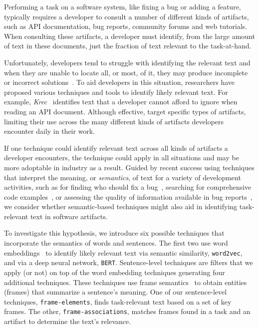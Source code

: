 Performing a task on a software system, like fixing a bug
or adding a feature, typically requires a developer to consult
a number of different kinds of artifacts, such
as API documentation, bug reports, community forums
and web tutorials.  When consulting these artifacts,
a developer must identify, from the large amount of text
in these documents, just the fraction of text relevant
to the task-at-hand.



Unfortunately, developers tend to struggle with identifying
the relevant text and when they are unable to locate all, or most, of it,
they may produce incomplete or incorrect solutions~\cite{Murphy2005}.
To aid developers in this situation,
researchers have proposed various
techniques and tools to
identify likely relevant text.
For example,
\textit{Krec}~\cite{Robillard2015}
identifies text that a developer cannot afford to ignore when reading an API document.
Although effective, 
target specific
types of artifacts, limiting their use across the
many different kinds of artifacts developers encounter
daily in their work.



If one technique could identify relevant text across all kinds
of artifacts a developer encounters, the technique
could apply in all situations and may be more adoptable in industry
as a result. Guided by recent success  using
techniques that interpret the meaning, or \textit{semantics}, of text
for a variety of development activities, such as
for finding who should fix a bug~\cite{yang2016}, searching for comprehensive code examples~\cite{silva2019},
or assessing the quality of information available in bug reports~\cite{chaparro2019}, we consider
 whether
semantic-based techniques might also aid in identifying
task-relevant text in software artifacts.


To investigate this hypothesis, we introduce six possible techniques that incorporate the
semantics of words and sentences.
The first two use word embeddings~\cite{Mikolov2013} to identify likely relevant text via semantic similarity, \texttt{word2vec},
and via a deep neural network, \texttt{BERT}.
Sentence-level techniques are filters that we apply (or not) on top of the word embedding techniques generating four additional techniques.
These techniques use frame semantics~\cite{fillmore1976frame} to obtain entities (frames) that summarize a sentence's meaning.
One of our sentence-level techniques, \texttt{frame-elements}, finds task-relevant text based on a set of key frames.
The other, \texttt{frame-associations}, matches frames found in a task and an artifact to determine the text's relevance.



